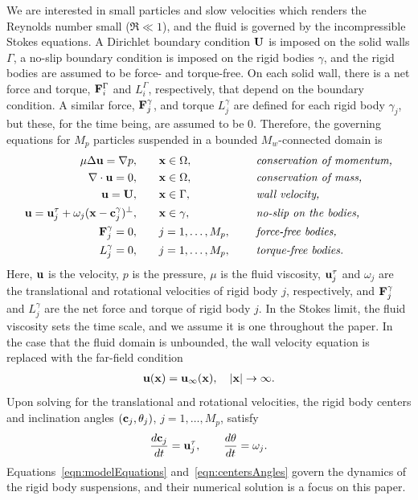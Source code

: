 \documentclass[AMA,STIX1COL]{WileyNJD-v2}
\begin{document}
We are interested in small particles and slow velocities which renders
the Reynolds number small ($\Re \ll 1$), and the fluid is governed by the
incompressible Stokes equations.  A Dirichlet boundary condition ${\mathbf{U}}$
is imposed on the solid walls $\Gamma$, a no-slip boundary condition is
imposed on the rigid bodies $\gamma$, and the rigid bodies are assumed
to be force- and torque-free.  On each solid wall, there is a net force
and torque, ${\mathbf{F}}^\Gamma_i$ and $L^\Gamma_i$, respectively, that depend
on the boundary condition.  A similar force, ${\mathbf{F}}^\gamma_j$, and torque
$L^\gamma_j$ are defined for each rigid body $\gamma_j$, but these, for
the time being, are assumed to be 0.  Therefore, the governing equations
for $M_p$ particles suspended in a bounded $M_w$-connected domain is
\begin{equation}
  \label{eqn:modelEquations}
  \begin{aligned}
  \mu \Delta {\mathbf{u}} = {\nabla} p, &\hspace{20pt} {\mathbf{x}} \in \Omega, \hspace*{.2in}
    &&\mbox{\em conservation of momentum,}\\
  {\nabla} \cdot {\mathbf{u}} = 0, &\hspace{20pt} {\mathbf{x}} \in \Omega, \hspace*{.2in}
    &&\mbox{\em conservation of mass,} \\
  {\mathbf{u}} = {\mathbf{U}}, &\hspace{20pt} {\mathbf{x}} \in \Gamma, \hspace*{.2in} 
    &&\mbox{\em wall velocity,} \\
  {\mathbf{u}} = {\mathbf{u}}^\tau_j + \omega_j({\mathbf{x}}-{\mathbf{c}}^\gamma_j)^\perp,&\hspace{20pt} 
    {\mathbf{x}} \in \gamma, \hspace*{.2in} &&\mbox{\em no-slip on the bodies,} \\
  {\mathbf{F}}_j^\gamma = 0, &\hspace{20pt}j=1,\ldots,M_p, \hspace*{.2in} 
    &&\mbox{\em force-free bodies,} \\
  L_j^\gamma = 0, &\hspace{20pt}j=1,\ldots,M_p, \hspace*{.2in} 
    &&\mbox{\em torque-free bodies.}
  \end{aligned}
\end{equation}
Here, ${\mathbf{u}}$ is the velocity, $p$ is the pressure, $\mu$ is the fluid
viscosity, ${\mathbf{u}}^\tau_j$ and $\omega_j$ are the translational and
rotational velocities of rigid body $j$, respectively, and
${\mathbf{F}}_j^\gamma$ and $L_j^\gamma$ are the net force and torque of rigid
body $j$.  In the Stokes limit, the fluid viscosity sets
the time scale, and we assume it is one throughout the paper.  In the
case that the fluid domain is unbounded, the wall velocity equation is
replaced with the far-field condition
\begin{align*}
  {\mathbf{u}}({\mathbf{x}}) = {\mathbf{u}}_\infty({\mathbf{x}}), \quad |{\mathbf{x}}| \rightarrow \infty.
\end{align*}
Upon solving for the translational and rotational velocities, the rigid
body centers and inclination angles $({\mathbf{c}}_j,\theta_j)$,
$j=1,\ldots,M_p$, satisfy
\begin{align}
  \frac{d{\mathbf{c}}_j}{dt} = {\mathbf{u}}^\tau_j, \qquad 
  \frac{d\theta}{dt} = \omega_j.
\label{eqn:centersAngles}
\end{align}
Equations~\eqref{eqn:modelEquations} and~\eqref{eqn:centersAngles} govern
the dynamics of the rigid body suspensions, and their numerical solution
is a focus on this paper.
\end{document}
